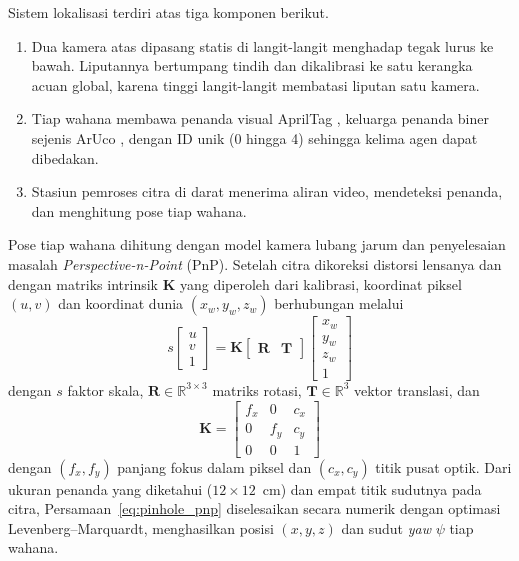 \documentclass[12pt,a4paper]{report}
\begin{document}
Sistem lokalisasi terdiri atas tiga komponen berikut.
\begin{enumerate}
    \item Dua kamera atas dipasang statis di langit-langit menghadap tegak lurus ke bawah. Liputannya bertumpang tindih dan dikalibrasi ke satu kerangka acuan global, karena tinggi langit-langit membatasi liputan satu kamera.
    \item Tiap wahana membawa penanda visual AprilTag \cite{olsonAprilTagRobustFlexible2011, wangAprilTag2Efficient2016, krogiusFlexibleLayoutsFiducial2019}, keluarga penanda biner sejenis ArUco \cite{garridojuradoAutomaticGenerationDetection2014}, dengan ID unik (0 hingga 4) sehingga kelima agen dapat dibedakan.
    \item Stasiun pemroses citra di darat menerima aliran video, mendeteksi penanda, dan menghitung pose tiap wahana.
\end{enumerate}

Pose tiap wahana dihitung dengan model kamera lubang jarum dan penyelesaian masalah \textit{Perspective-n-Point} (PnP). Setelah citra dikoreksi distorsi lensanya dan dengan matriks intrinsik $\mathbf{K}$ yang diperoleh dari kalibrasi, koordinat piksel $(u, v)$ dan koordinat dunia $(x_w, y_w, z_w)$ berhubungan melalui
\begin{equation}
    s 
    \begin{bmatrix}
        u \\ v \\ 1
    \end{bmatrix}
    = \mathbf{K} 
    \begin{bmatrix}
        \mathbf{R} & \mathbf{T}
    \end{bmatrix}
    \begin{bmatrix}
        x_w \\ y_w \\ z_w \\ 1
    \end{bmatrix}
    \label{eq:pinhole_pnp}
\end{equation}
dengan $s$ faktor skala, $\mathbf{R} \in \mathbb{R}^{3 \times 3}$ matriks rotasi, $\mathbf{T} \in \mathbb{R}^3$ vektor translasi, dan
\begin{equation}
    \mathbf{K} = 
    \begin{bmatrix}
        f_x & 0 & c_x \\
        0 & f_y & c_y \\
        0 & 0 & 1
    \end{bmatrix}
\end{equation}
dengan $(f_x, f_y)$ panjang fokus dalam piksel dan $(c_x, c_y)$ titik pusat optik. Dari ukuran penanda yang diketahui ($12 \times 12$~cm) dan empat titik sudutnya pada citra, Persamaan~\ref{eq:pinhole_pnp} diselesaikan secara numerik dengan optimasi Levenberg\allowbreak--Marquardt, menghasilkan posisi $(x, y, z)$ dan sudut \textit{yaw} $\psi$ tiap wahana.
\end{document}
